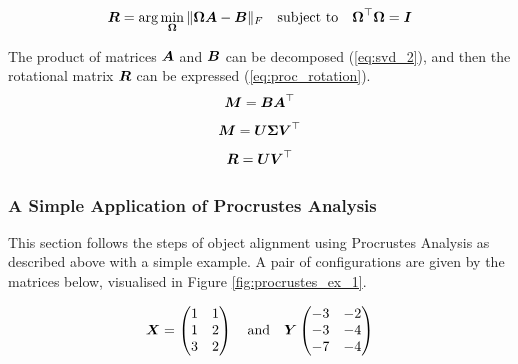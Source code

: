 \begin{equation}
    \label{eq:orth_proc_prob}
    {\boldsymbol{{R}}} =\operatorname*{arg}\operatorname*{min}_{\boldsymbol{{\Omega}}} 
        \| {\boldsymbol{{\Omega}}} {\boldsymbol{{A}}} - {\boldsymbol{{B}}} \|_F
        \quad
        \text{subject to}
        \quad
        {\boldsymbol{{\Omega}}}^\top {\boldsymbol{{\Omega}}} = {\boldsymbol{{I}}}
\end{equation}

The product of matrices ${\boldsymbol{{A}}}$ and ${\boldsymbol{{B}}}$ can be decomposed (\ref{eq:svd_2}), and then the rotational matrix ${\boldsymbol{{R}}}$ can be expressed (\ref{eq:proc_rotation}).
\begin{equation} \label{eq:svd_1}
    {\boldsymbol{{M}}} = {\boldsymbol{{B}}} {\boldsymbol{{A}}}^\top
\end{equation}
\begin{equation} \label{eq:svd_2}
    {\boldsymbol{{M}}} = {\boldsymbol{{U}}} {\boldsymbol{{\Sigma}}} {\boldsymbol{{V}}}^\top
\end{equation}
\begin{equation} \label{eq:proc_rotation}
    {\boldsymbol{{R}}} = {\boldsymbol{{U}}} {\boldsymbol{{V}}}^\top
\end{equation}

\subsubsection{A Simple Application of Procrustes Analysis}
This section follows the steps of object alignment using Procrustes Analysis as described above with a simple example.
A pair of configurations are given by the matrices below, visualised in Figure \ref{fig:procrustes_ex_1}.

\begin{equation*}
    {\boldsymbol{{X}}} = 
    \begin{pmatrix} 
        1 & 1 \\
        1 & 2 \\
        3 & 2
    \end{pmatrix}
    \quad 
    \text{and} 
    \quad 
    {\boldsymbol{{Y}}}
    \begin{pmatrix} 
        -3 & -2 \\
        -3 & -4 \\
        -7 & -4
    \end{pmatrix}
\end{equation*}

